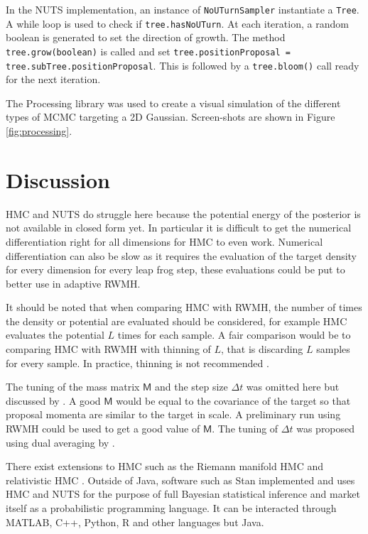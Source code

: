 \documentclass[10pt]{proc}
\newcommand{\matr}[1]{\mathsf{#1}}
\begin{document}
In the NUTS implementation, an instance of \texttt{NoUTurnSampler} instantiate a \texttt{Tree}. A while loop is used to check if \texttt{tree.hasNoUTurn}. At each iteration, a random boolean is generated to set the direction of growth. The method \texttt{tree.grow(boolean)} is called and set \texttt{tree.positionProposal = tree.subTree.positionProposal}. This is followed by a \texttt{tree.bloom()} call ready for the next iteration.

The Processing library \citep{reas2007processing} was used to create a visual simulation of the different types of MCMC targeting a 2D Gaussian. Screen-shots are shown in Figure \ref{fig:processing}.

\section{Discussion}
HMC and NUTS do struggle here because the potential energy of the posterior is not available in closed form yet. In particular it is difficult to get the numerical differentiation right for all dimensions for HMC to even work. Numerical differentiation can also be slow as it requires the evaluation of the target density for every dimension for every leap frog step, these evaluations could be put to better use in adaptive RWMH.

It should be noted that when comparing HMC with RWMH, the number of times the density or potential are evaluated should be considered, for example HMC evaluates the potential $L$ times for each sample. A fair comparison would be to comparing HMC with RWMH with thinning of $L$, that is discarding $L$ samples for every sample. In practice, thinning is not recommended \citep{geyer1992practical}.

The tuning of the mass matrix $\matr{M}$ and the step size $\Delta t$ was omitted here but discussed by \cite{hoffman2014no}. A good $\matr{M}$ would be equal to the covariance of the target so that proposal momenta are similar to the target in scale. A preliminary run using RWMH could be used to get a good value of $\matr{M}$. The tuning of $\Delta t$ was proposed using dual averaging by \cite{hoffman2014no}.

There exist extensions to HMC such as the Riemann manifold HMC \citep{girolami2011riemann} and relativistic HMC \citep{lu2016relativistic}. Outside of Java, software such as Stan \citep{carpenter2017stan} implemented and uses HMC and NUTS for the purpose of full Bayesian statistical inference and market itself as a probabilistic programming language. It can be interacted through MATLAB, C++, Python, R and other languages but Java.
\end{document}
